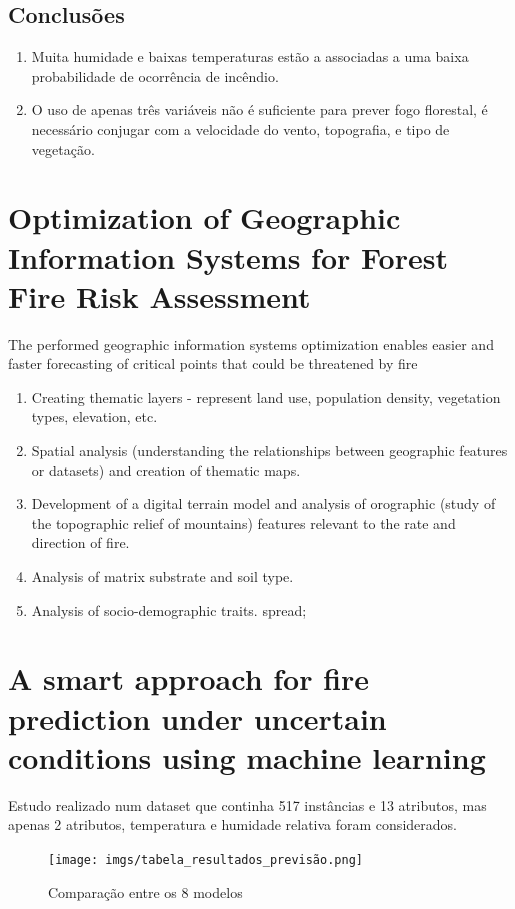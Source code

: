 \documentclass{article}
\begin{document}
\subsection{Conclusões}
\begin{enumerate}
    \item Muita humidade e baixas temperaturas estão a associadas a uma baixa probabilidade de ocorrência de incêndio.
    \item O uso de apenas três variáveis não é suficiente para prever fogo florestal, é necessário conjugar com a velocidade do vento, topografia, e tipo de vegetação.
\end{enumerate}


\section{Optimization of Geographic Information Systems 
for Forest Fire Risk Assessment \cite{9167162}}
The performed geographic information systems optimization enables easier and faster forecasting of critical points that could be threatened by fire
\begin{enumerate}
    \item Creating thematic layers - represent land use, population density, vegetation types, elevation, etc.
    \item Spatial analysis (understanding the relationships between geographic features or datasets) and creation of thematic maps.
    \item Development of a digital terrain model and analysis of orographic (study of the topographic relief of mountains) features relevant to the rate and direction of fire.
    \item Analysis of matrix substrate and soil type.
    \item Analysis of socio-demographic traits.
spread;
\end{enumerate}


\section{A smart approach for fire prediction under uncertain
conditions using machine learning \cite{Sharma2020}}
Estudo realizado num dataset que continha 517 instâncias e 13 atributos, mas apenas 2 atributos, temperatura e humidade relativa foram considerados.

\begin{figure}[ht]
 \centering
  \texttt{[image: imgs/tabela\_resultados\_previsão.png]}
   \caption{\label{fig:flow_chaft}Comparação entre os 8 modelos}
\end{figure}
\end{document}
